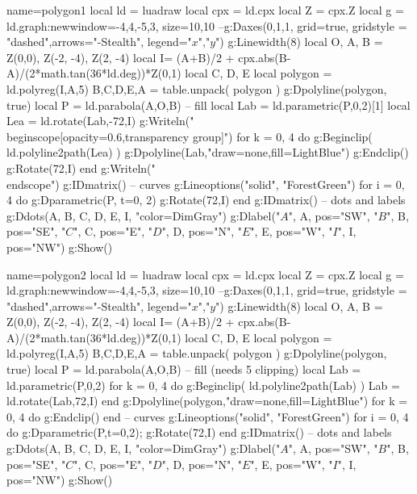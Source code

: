 \documentclass[border=2mm]{standalone}%
\newcommand*{\fillColor}{LightBlue}
\begin{document}
\begin{luadraw}{name=polygon1}
local ld = luadraw
local cpx = ld.cpx
local Z = cpx.Z
local g = ld.graph:new{window={-4,4,-5,3}, size={10,10}}
--g:Daxes({0,1,1}, {grid=true, gridstyle = "dashed",arrows="-Stealth", legend={"$x$","$y$"}})
g:Linewidth(8)
local O, A, B = Z(0,0), Z(-2, -4), Z(2, -4)
local I= (A+B)/2 + cpx.abs(B-A)/(2*math.tan(36*ld.deg))*Z(0,1)
local C, D, E
local polygon = ld.polyreg(I,A,5)
B,C,D,E,A = table.unpack( polygon )
g:Dpolyline(polygon, true)
local P = ld.parabola(A,O,B)
-- fill
local Lab = ld.parametric(P,0,2)[1]
local Lea = ld.rotate(Lab,-72,I)
g:Writeln("\\begin{scope}[opacity=0.6,transparency group]")
for k = 0, 4 do
    g:Beginclip( ld.polyline2path(Lea) )
        g:Dpolyline(Lab,"draw=none,fill=\fillColor")
    g:Endclip()
    g:Rotate(72,I)
end
g:Writeln("\\end{scope}")
g:IDmatrix()
-- curves
g:Lineoptions("solid", "ForestGreen")
for i = 0, 4 do
  g:Dparametric(P, {t={0, 2}})
  g:Rotate(72,I)
end
g:IDmatrix()
-- dots and labels
g:Ddots({A, B, C, D, E, I}, "color=DimGray")
g:Dlabel("$A$", A, {pos="SW"}, 
       "$B$", B, {pos="SE"}, 
       "$C$", C, {pos="E"}, 
       "$D$", D, {pos="N"}, 
       "$E$", E, {pos="W"}, 
       "$I$", I, {pos="NW"})
g:Show()
\end{luadraw}

\begin{luadraw}{name=polygon2}
local ld = luadraw
local cpx = ld.cpx
local Z = cpx.Z
local g = ld.graph:new{window={-4,4,-5,3}, size={10,10}}
--g:Daxes({0,1,1}, {grid=true, gridstyle = "dashed",arrows="-Stealth", legend={"$x$","$y$"}})
g:Linewidth(8)
local O, A, B = Z(0,0), Z(-2, -4), Z(2, -4)
local I= (A+B)/2 + cpx.abs(B-A)/(2*math.tan(36*ld.deg))*Z(0,1)
local C, D, E
local polygon = ld.polyreg(I,A,5)
B,C,D,E,A = table.unpack( polygon )
g:Dpolyline(polygon, true)
local P = ld.parabola(A,O,B)
-- fill (needs 5 clipping)
local Lab = ld.parametric(P,0,2)
for k = 0, 4 do
    g:Beginclip( ld.polyline2path(Lab) )
    Lab = ld.rotate(Lab,72,I)
end
g:Dpolyline(polygon,"draw=none,fill=\fillColor")
for k = 0, 4 do
    g:Endclip()
end
-- curves
g:Lineoptions("solid", "ForestGreen")
for i = 0, 4 do
  g:Dparametric(P,{t={0,2}}); g:Rotate(72,I)
end
g:IDmatrix()
-- dots and labels
g:Ddots({A, B, C, D, E, I}, "color=DimGray")
g:Dlabel("$A$", A, {pos="SW"}, 
       "$B$", B, {pos="SE"}, 
       "$C$", C, {pos="E"}, 
       "$D$", D, {pos="N"}, 
       "$E$", E, {pos="W"}, 
       "$I$", I, {pos="NW"})
g:Show()
\end{luadraw}
\end{document}
